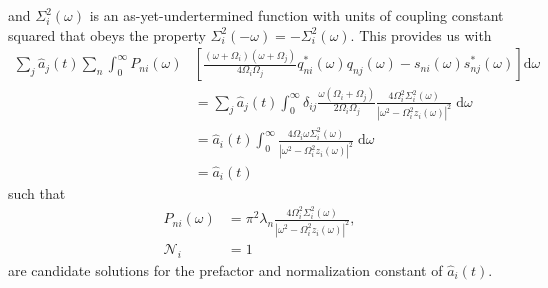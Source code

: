 and $\Sigma_i^2(\omega)$ is an as-yet-undertermined function with units of coupling constant squared that obeys the property $\Sigma_i^2(-\omega) = -\Sigma_i^2(\omega)$. This provides us with
\begin{equation}
\begin{split}
\sum_j\hat{a}_j(t)\sum_n\int_0^\infty P_{ni}(\omega)&\left[\frac{(\omega + \Omega_i)(\omega + \Omega_j)}{4\Omega_i\Omega_j}q_{ni}^*(\omega)q_{nj}(\omega) - s_{ni}(\omega)s_{nj}^*(\omega)\right]\mathrm{d}\omega\\
&= \sum_j\hat{a}_j(t)\int_0^\infty\delta_{ij}\frac{\omega(\Omega_i + \Omega_j)}{2\Omega_i\Omega_j}\frac{4\Omega_i^2\Sigma_i^2(\omega)}{|\omega^2 - \Omega_i^2z_i(\omega)|^2}\;\mathrm{d}\omega\\
&= \hat{a}_i(t)\int_0^\infty\frac{4\Omega_i\omega\Sigma_i^2(\omega)}{|\omega^2 - \Omega_i^2z_i(\omega)|^2}\;\mathrm{d}\omega\\
&= \hat{a}_i(t)
\end{split}
\end{equation}
such that
\begin{equation}
\begin{split}
P_{ni}(\omega) &= \pi^2\lambda_n\frac{4\Omega_i^2\Sigma_i^2(\omega)}{|\omega^2 - \Omega_i^2z_i(\omega)|^2},\\
\mathcal{N}_i &= 1
\end{split}
\end{equation}
are candidate solutions for the prefactor and normalization constant of $\hat{a}_i(t)$.

